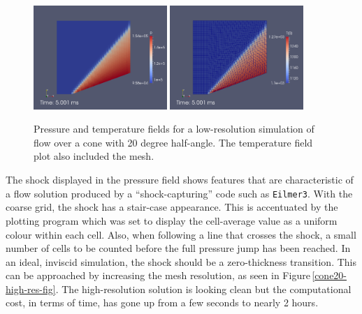 \begin{figure}[htbp]
\begin{center}
\includegraphics[width=0.45\textwidth]{../2D/cone20-simple/cone20_p.png}
\includegraphics[width=0.45\textwidth]{../2D/cone20-simple/cone20_T0_with-mesh.png}
\end{center}
\caption{Pressure and temperature fields for a low-resolution simulation 
         of flow over a cone with 20 degree half-angle.
         The temperature field plot also included the mesh.}
\label{cone20-low-res-fig}
\end{figure}


\medskip
The shock displayed in the pressure field shows features that are characteristic 
of a flow solution produced by a ``shock-capturing'' code such as \verb!Eilmer3!.
With the coarse grid, the shock has a stair-case appearance.
This is accentuated by the plotting program which was set to display 
the cell-average value as a uniform colour within each cell.
Also, when following a line that crosses the shock,
a small number of cells to be counted before the full pressure jump has been reached.
In an ideal, inviscid simulation, the shock should be a zero-thickness transition.
This can be approached by increasing the mesh resolution, as seen in Figure\,\ref{cone20-high-res-fig}.
The high-resolution solution is looking clean but the computational cost, in terms of time, 
has gone up from a few seconds to nearly 2 hours.


